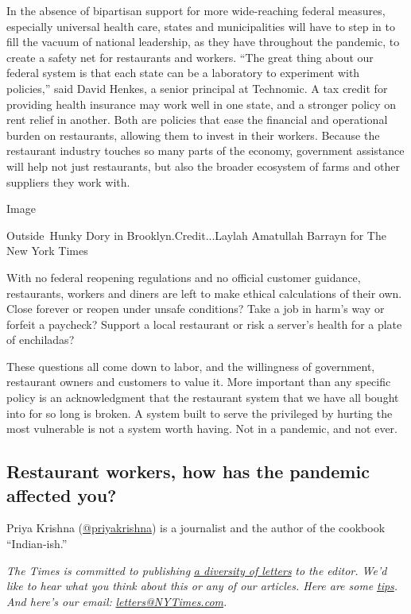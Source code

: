 In the absence of bipartisan support for more wide-reaching federal
measures, especially universal health care, states and municipalities
will have to step in to fill the vacuum of national leadership, as they
have throughout the pandemic, to create a safety net for restaurants and
workers. ``The great thing about our federal system is that each state
can be a laboratory to experiment with policies,'' said David Henkes, a
senior principal at Technomic. A tax credit for providing health
insurance may work well in one state, and a stronger policy on rent
relief in another. Both are policies that ease the financial and
operational burden on restaurants, allowing them to invest in their
workers. Because the restaurant industry touches so many parts of the
economy, government assistance will help not just restaurants, but also
the broader ecosystem of farms and other suppliers they work with.

Image

Outside~Hunky Dory in Brooklyn.Credit...Laylah Amatullah Barrayn for The
New York Times

With no federal reopening regulations and no official customer guidance,
restaurants, workers and diners are left to make ethical calculations of
their own. Close forever or reopen under unsafe conditions? Take a job
in harm's way or forfeit a paycheck? Support a local restaurant or risk
a server's health for a plate of enchiladas?

These questions all come down to labor, and the willingness of
government, restaurant owners and customers to value it. More important
than any specific policy is an acknowledgment that the restaurant system
that we have all bought into for so long is broken. A system built to
serve the privileged by hurting the most vulnerable is not a system
worth having. Not in a pandemic, and not ever.

\hypertarget{restaurant-workers-how-has-the-pandemic-affected-you}{%
\subsection{Restaurant workers, how has the pandemic affected
you?}\label{restaurant-workers-how-has-the-pandemic-affected-you}}

Priya Krishna (\href{https://twitter.com/priyakrishna}{@priyakrishna})
is a journalist and the author of the cookbook ``Indian-ish.''

\emph{The Times is committed to publishing}
\href{https://www.nytimes3xbfgragh.onion/2019/01/31/opinion/letters/letters-to-editor-new-york-times-women.html}{\emph{a
diversity of letters}} \emph{to the editor. We'd like to hear what you
think about this or any of our articles. Here are some}
\href{https://help.nytimes3xbfgragh.onion/hc/en-us/articles/115014925288-How-to-submit-a-letter-to-the-editor}{\emph{tips}}\emph{.
And here's our email:}
\href{mailto:letters@NYTimes.com}{\emph{letters@NYTimes.com}}\emph{.}

